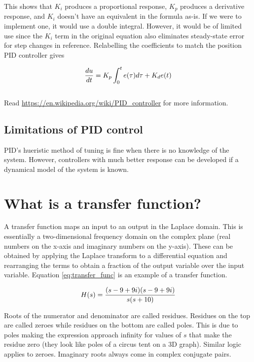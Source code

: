 \documentclass[10pt,conference,compsoc]{IEEEtran}
\begin{document}
\noindent This shows that $K_i$ produces a proportional response, $K_p$ produces
a derivative response, and $K_i$ doesn't have an equivalent in the formula
as-is. If we were to implement one, it would use a double integral. However, it
would be of limited use since the $K_i$ term in the original equation also
eliminates steady-state error for step changes in reference. Relabelling the
coefficients to match the position PID controller gives

\begin{equation}
  \frac{du}{dt} = K_p \int_0^t e(\tau) d\tau + K_d e(t) \\
\end{equation}
\\
\noindent Read \url{https://en.wikipedia.org/wiki/PID_controller} for more
information.

\subsection{Limitations of PID control}

\noindent PID's hueristic method of tuning is fine when there is no knowledge of
the system. However, controllers with much better response can be developed if a
dynamical model of the system is known.

\section{What is a transfer function?}

\noindent A transfer function maps an input to an output in the Laplace domain.
This is essentially a two-dimensional frequency domain on the complex plane
(real numbers on the x-axis and imaginary numbers on the y-axis). These can be
obtained by applying the Laplace transform to a differential equation and
rearranging the terms to obtain a fraction of the output variable over the input
variable. Equation \ref{eq:transfer_func} is an example of a transfer function.

\begin{equation} \label{eq:transfer_func}
  H(s) = \frac{(s-9+9i)(s-9+9i)}{s(s+10)} \\
\end{equation}

\noindent Roots of the numerator and denominator are called residues. Residues
on the top are called zeroes while residues on the bottom are called poles. This
is due to poles making the expression approach infinity for values of $s$ that
make the residue zero (they look like poles of a circus tent on a 3D graph).
Similar logic applies to zeroes. Imaginary roots always come in complex
conjugate pairs.
\end{document}
